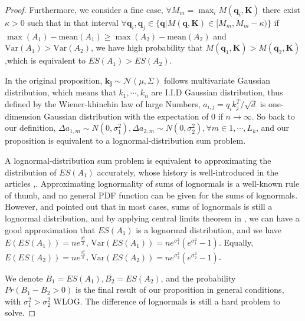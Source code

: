 \documentclass[letterpaper]{article} %
\newcommand{\mb}{\mathbf}
\begin{document}
\begin{appendices}
\begin{proof}
Furthermore, we consider a fine case, $\forall M_{m} = \max_{i} M(\mb{q}_i, \mb{K})$ there exist $\kappa > 0$ such that in that interval $\forall \mb{q}_i, \mb{q}_j \in \{ \mb{q} | M(\mb{q}, \mb{K}) \in [ M_{m},  M_{m} - \kappa)\}$ if $\max(A_1)-\mathrm{mean}(A_1)\geq \max(A_2)-\mathrm{mean}(A_2)$ and~$\mathrm{Var}(A_1) > \mathrm{Var}(A_2)$, we have high probability that $M(\mb{q}_1, \mb{K}) > M(\mb{q}_2, \mb{K})$,which is equivalent to $ES(A_1) > ES(A_2)$.

In the original proposition, $\mathbf{k}_{\mathbf{j}} \sim \mathcal{N}(\mu, \Sigma)$ follows multivariate Gaussian distribution, which means that $k_1,\cdots,k_n$ are I.I.D Gaussian distribution, thus defined by the Wiener-khinchin law of large Numbers, $a_{i,j}={q_i k_j^T}/{\sqrt{d}}$ is one-dimension Gaussian distribution with the expectation of 0 if $n\rightarrow \infty$. So back to our definition, $\Delta a_{1,m} \sim N(0,\sigma_1^2),\Delta a_{2,m} \sim N(0,\sigma_2^2),\forall m\in 1,\cdots,L_k$, and our proposition is equivalent to a lognormal-distribution sum problem.
 
A lognormal-distribution sum problem is equivalent to approximating the distribution of $ES(A_1)$ accurately, whose history is well-introduced in the articles \cite{dufresne2008sums},\cite{vargasguzman2005change}. Approximating lognormality of sums of lognormals is a well-known rule of thumb, and no general PDF function can be given for the sums of lognormals. However, \cite{romeo2003broad} and \cite{hcine2015approximation} pointed out that in most cases, sums of lognormals is still a lognormal distribution, and by applying central limits theorem in \cite{beaulieu2011extended}, we can have a good approximation that $ES(A_1)$ is a lognormal distribution, and we have $E(ES(A_1))=ne^{\frac{\sigma_1^2}{2}}$, $\mathrm{Var}(ES(A_1))=ne^{\sigma_1^2}(e^{\sigma_1^2}-1)$. Equally, $E(ES(A_2))=ne^{\frac{\sigma_2^2}{2}}$, $\mathrm{Var}(ES(A_2))=ne^{\sigma_2^2}(e^{\sigma_2^2}-1)$.

We denote $B_1=ES(A_1),B_2=ES(A_2)$, and the probability $Pr(B_1-B_2>0)$ is the final result of our proposition in general conditions, with $\sigma_1^2>\sigma_2^2$ WLOG. The difference of lognormals is still a hard problem to solve.


\end{proof}
\end{appendices}
\end{document}
